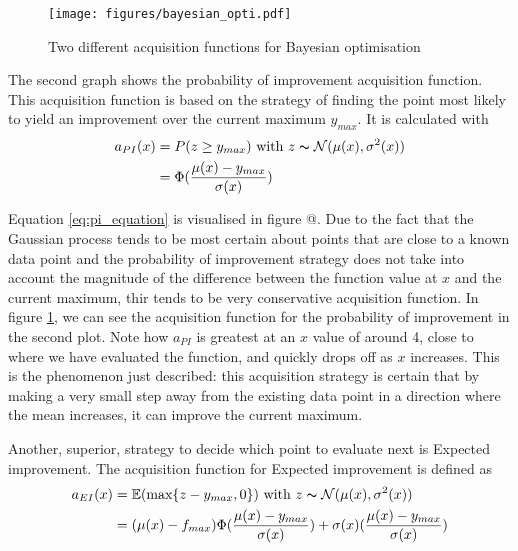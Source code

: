\documentclass[a4paper,12pt,twoside,openright]{report}
\begin{document}
\begin{figure}
\centering
  \texttt{[image: figures/bayesian\_opti.pdf]}
  \caption{Two different acquisition functions for Bayesian optimisation}
  \label{bayesianopti}
\end{figure}

The second graph shows the probability of improvement acquisition function. This acquisition function is based on the strategy of finding the point most likely to yield an improvement over the current maximum $y_{max}$. It is calculated with
\begin{align}
a_{PI}(x) &= P(z \geq y_{max}) \text{\ with\ } z \thicksim \mathcal{N}(\mu(x),\sigma^2(x))\label{eq:pi_equation}\\
&=\Phi(\frac{\mu(x) - y_{max}}{\sigma(x)})
\end{align}

Equation \ref{eq:pi_equation} is visualised in figure @. Due to the fact that the Gaussian process tends to be most certain about points that are close to a known data point and the probability of improvement strategy does not take into account the magnitude of the difference between the function value at $x$ and the current maximum, thir tends to be very conservative acquisition function. In figure \ref{bayesianopti}, we can see the acquisition function for the probability of improvement in the second plot. Note how $a_{PI}$ is greatest at an $x$ value of around 4, close to where we have evaluated the function, and quickly drops off as $x$ increases. This is the phenomenon just described: this acquisition strategy is certain that by making a very small step away from the existing data point in a direction where the mean increases, it can improve the current maximum.

Another, superior, strategy to decide which point to evaluate next is Expected improvement. The acquisition function for Expected improvement is defined \cite{eipaper} as
\begin{align}
a_{EI}(x) &= \mathbb{E}(\text{max}\{z - y_{max}, 0\}) \text{\ with\ } z \thicksim \mathcal{N}(\mu(x),\sigma^2(x))\\
&= (\mu(x) - f_{max})\Phi(\frac{\mu(x) - y_{max}}{\sigma(x)}) + \sigma(x)(\frac{\mu(x) - y_{max}}{\sigma(x)})
\end{align}
\end{document}
